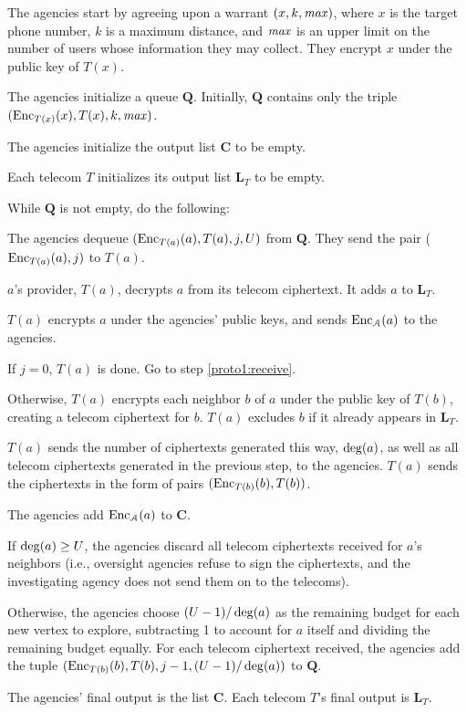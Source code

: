 \bce
\item The agencies start by agreeing upon a warrant $(x, k, \mathit{max})$, where $x$ is the target phone number, $k$ is a maximum distance, and $\mathit{max}$ is an upper limit on the number of users whose information they may collect. They encrypt $x$ under the public key of $T(x)$.
\item The agencies initialize a queue $\mathbf{Q}$. Initially, $\mathbf{Q}$ contains only the triple $(\operatorname{Enc}_{T(x)}(x), T(x), k, \mathit{max})$.
\item The agencies initialize the output list $\mathbf{C}$ to be empty.
\item Each telecom $T$ initializes its output list $\mathbf{L}_T$ to be empty.
\item While $\mathbf{Q}$ is not empty, do the following:
\bce
\item \label{proto1:top-of-loop} The agencies dequeue $(\operatorname{Enc}_{T(a)}(a), T(a), j, U)$ from $\mathbf{Q}$. They send the pair ($\operatorname{Enc}_{T(a)}(a), j)$ to $T(a)$.
\item $a$'s provider, $T(a)$, decrypts $a$ from its telecom ciphertext. It adds $a$ to $\mathbf{L}_T$.
\item \label{proto1:first-send} $T(a)$ encrypts $a$ under the agencies' public keys, and sends $\operatorname{Enc}_\mathcal{A}(a)$ to the agencies.
\item If $j=0$, $T(a)$ is done. Go to step \ref{proto1:receive}.
\item Otherwise, $T(a)$ encrypts each neighbor $b$ of $a$ under the public key of $T(b)$, creating a telecom ciphertext for $b$. $T(a)$ excludes $b$ if it already appears in $\mathbf{L}_T$.
\item \label{proto1:second-send} $T(a)$ sends the number of ciphertexts generated this way, $\operatorname{deg}(a)$, as well as all telecom ciphertexts generated in the previous step, to the agencies. $T(a)$ sends the ciphertexts in the form of pairs $(\operatorname{Enc}_{T(b)}(b), T(b))$.
\item \label{proto1:receive} The agencies add $\operatorname{Enc}_\mathcal{A}(a)$ to $\mathbf{C}$.
\item If $\operatorname{deg}(a)\geq U$, the agencies discard all telecom ciphertexts received for $a$'s neighbors (i.e., oversight agencies refuse to sign the ciphertexts, and the investigating agency does not send them on to the telecoms).
\item Otherwise, the agencies choose $(U-1)/\operatorname{deg}(a)$ as the remaining budget for each new vertex to explore, subtracting 1 to account for $a$ itself and dividing the remaining budget equally. For each telecom ciphertext received, the agencies add the tuple $(\operatorname{Enc}_{T(b)}(b), T(b), j-1, (U-1)/\operatorname{deg}(a))$ to $\mathbf{Q}$.
\ece
\item The agencies' final output is the list $\mathbf{C}$. Each telecom $T$'s final output is $\mathbf{L}_T$.
\ece

